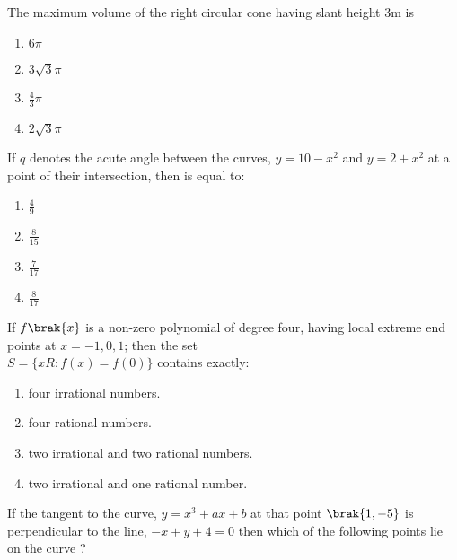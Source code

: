 \iffalse
  \title{Assignment}
  \author{Abhijeet Kumar - ai24btech11001}
  \section{mains}
\fi
\item The maximum volume  of the right circular cone having slant height 3m is 

\hfill {}
\begin{multicols}{2}
\begin{enumerate}
    \item $6\pi$
    \item $3\sqrt{3}\pi$
    \item $\frac{4}{3}\pi$
    \item $2\sqrt{3}\pi$
\end{enumerate}
\end{multicols}
\item If $q$ denotes the acute angle between the curves,
$y=10-x^2$ and $y=2+x^2$ at a point of their intersection, then is equal to: 
\hfill {}
\begin{multicols}{2}
\begin{enumerate}
    \item $\frac{4}{9}$
    \item $\frac{8}{15}$
    \item $\frac{7}{17}$ 
    \item $\frac{8}{17}$
\end{enumerate}
\end{multicols}
\item If $f\brak{x}$ is a non-zero polynomial of degree four, having local extreme end points at $ x=-1,0,1 $; then the set
\\ $S = \{x R:f(x)=f(0)\}$ contains exactly:
\hfill {}
\begin{enumerate}
    \item four irrational numbers.
    \item four rational numbers.
    \item two irrational and two rational numbers. 
    \item two irrational and one rational number.
\end{enumerate}
\item If the tangent to the curve, $y=x^{3}+ax+b$ at that point $\brak{1,-5}$ is perpendicular to the line, $-x+y+4=0$ then which of the following points lie on the curve ?
